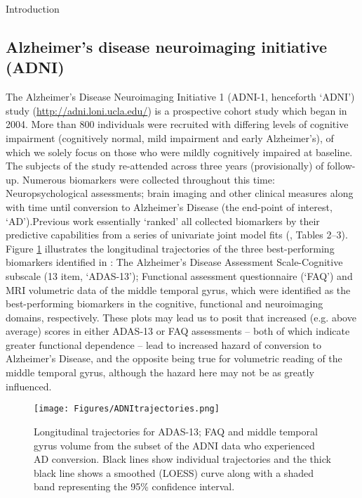 \begin{chapter}{\label{cha:intro}Introduction}
  \subsection{\label{sec:motivation-adni}Alzheimer's disease neuroimaging initiative (ADNI)}
  The Alzheimer's Disease Neuroimaging Initiative 1 (ADNI-1, henceforth `ADNI') study (\url{http://adni.loni.ucla.edu/}) is a prospective cohort study which began in 2004. More than 800 individuals were recruited with differing levels of cognitive impairment (cognitively normal, mild impairment and early Alzheimer's), of which we solely focus on those who were mildly cognitively impaired at baseline. The subjects of the study re-attended across three years (provisionally) of follow-up. Numerous biomarkers were collected throughout this time: Neuropsychological assessments; brain imaging and other clinical measures along with time until conversion to Alzheimer's Disease (the end-point of interest, `AD').\newline Previous work essentially `ranked' all collected biomarkers by their predictive capabilities from a series of univariate joint model fits (\cite{Li2017A}, Tables 2--3). Figure \ref{fig:ADNItrajectories} illustrates the longitudinal trajectories of the three best-performing biomarkers identified in \cite{Li2017A}: The Alzheimer’s Disease Assessment Scale-Cognitive subscale (13 item, ‘ADAS-13’); Functional assessment questionnaire (‘FAQ’) and MRI volumetric data of the middle temporal gyrus, which were identified as the best-performing biomarkers in the cognitive, functional and neuroimaging domains, respectively. These plots may lead us to posit that increased (e.g. above average) scores in either ADAS-13 or FAQ assessments -- both of which indicate greater functional dependence -- lead to increased hazard of conversion to Alzheimer's Disease, and the opposite being true for volumetric reading of the middle temporal gyrus, although the hazard here may not be as greatly influenced.
  
  \begin{figure}[t]
      \centering
      \texttt{[image: Figures/ADNItrajectories.png]}
      \caption{Longitudinal trajectories for ADAS-13; FAQ and middle temporal gyrus volume from the subset of the ADNI data who experienced AD conversion. Black lines show individual trajectories and the thick black line shows a smoothed (LOESS) curve along with a shaded band representing the 95\% confidence interval.}
      \label{fig:ADNItrajectories}
  \end{figure}
  

\end{chapter}
